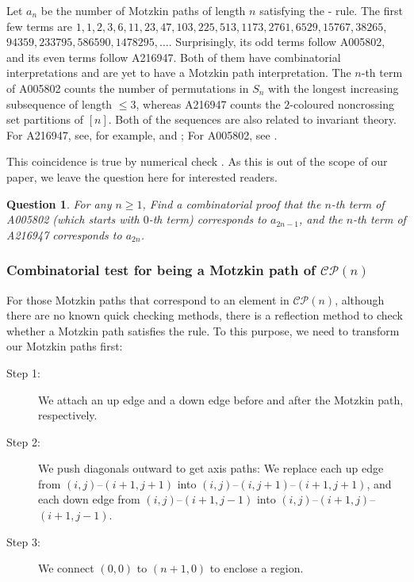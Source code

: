 \documentclass[pdflatex,sn-mathphys-num]{sn-jnl}%
\theoremstyle{thmstyleone}%
\newtheorem{question}[theorem]{Question}
\theoremstyle{thmstyletwo}%
\theoremstyle{thmstylethree}%
\numberwithin{equation}{section}
\begin{document}
            Let $a_n$ be the number of Motzkin paths of length $n$ satisfying the \red-\blue{} rule. The first few terms are $1,1,2,3,6,11,23,47,103,225, 513,1173, 2761, 6529, 15767, 38265$, $94359, 233795, 586590, 1478295, \ldots$. Surprisingly, its odd terms follow A005802, and its even terms follow A216947. Both of them have combinatorial interpretations and are yet to have a Motzkin path interpretation. 
            The $n$-th term of A005802 counts the number of permutations in $S_n$ with the longest increasing subsequence of length $\leq 3$, 
            whereas A216947 counts the $2$-coloured noncrossing set partitions of $[n]$. 
            Both of the sequences are also related to invariant theory.
            For A216947, see, for example, \cite[A216947]{oeis} and \cite{bostan2019sequencesassociatedinvarianttheory,bostan2022combinatorialsequencesassociatedinvariant}; 
            For A005802, see \cite[A005802]{oeis}.

            This coincidence is true by numerical check \cite[A389602]{oeis}. As this is out of the scope of our paper, we leave the question here for interested readers.
            \begin{question}
                 For any $n\geq 1$, Find a combinatorial proof that the $n$-th term of A005802 (which starts with $0$-th term) corresponds to $a_{2n-1}$, and the $n$-th term of A216947 corresponds to $a_{2n}$.
            \end{question}
            

        \subsubsection{Combinatorial test for being a Motzkin path of \texorpdfstring{$\mathcal{CP}(n)$}{CP(n)}}
        For those Motzkin paths that correspond to an element in $\mathcal{CP}(n)$, although there are no known quick checking methods, there is a reflection method to check whether a Motzkin path satisfies the rule. To this purpose, we need to transform our Motzkin paths first:
        \begin{description}
            \item[Step 1:] We attach an up edge and a down edge before and after the Motzkin path, respectively. 
            \item[Step 2:] We push diagonals outward to get axis paths: We replace each up edge from $(i,j)$--$(i+1,j+1)$ into $(i,j)$--$(i,j+1)$--$(i+1,j+1)$, and each down edge from $(i,j)$--$(i+1,j-1)$ into $(i,j)$--$(i+1,j)$--$(i+1,j-1)$.
            \item[Step 3:] We connect $(0,0)$ to $(n+1,0)$ to enclose a region.
        \end{description}  
\end{document}
